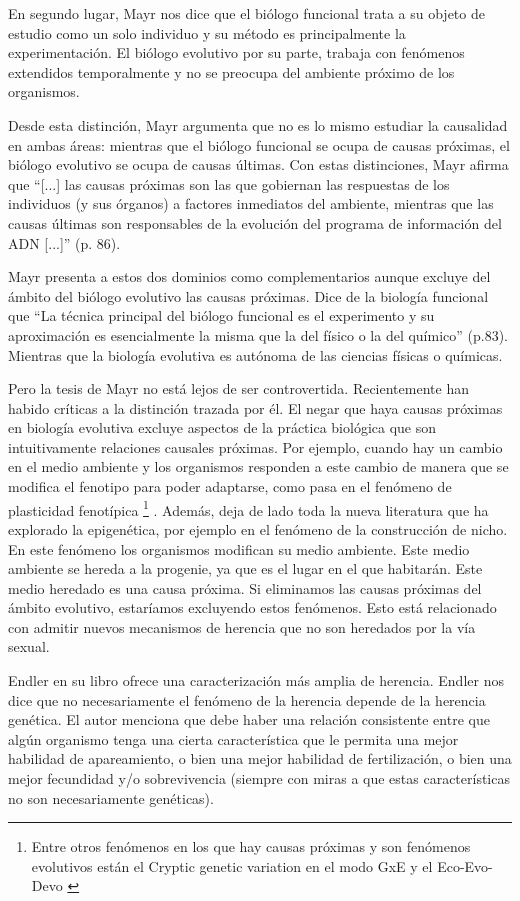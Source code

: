 En segundo lugar, Mayr nos dice que el biólogo funcional trata a su objeto de estudio como un solo individuo y su método es principalmente la experimentación. El biólogo evolutivo por su parte, trabaja con fenómenos extendidos temporalmente y no se preocupa del ambiente próximo de los organismos.

Desde esta distinción, Mayr argumenta que no es lo mismo estudiar la causalidad en ambas áreas: mientras que el biólogo funcional se ocupa de causas próximas, el biólogo evolutivo se ocupa de causas últimas. Con estas distinciones, Mayr afirma que ``[...] las causas próximas son las que gobiernan las respuestas de los individuos (y sus órganos) a factores inmediatos del ambiente, mientras que las causas últimas son responsables de la evolución del programa de información del ADN [...]'' (p. 86).

Mayr presenta a estos dos dominios como complementarios aunque excluye del ámbito del biólogo evolutivo las causas próximas. Dice de la biología funcional que ``La técnica principal del biólogo funcional es el experimento y su aproximación es esencialmente la misma que la del físico o la del químico'' (p.83). Mientras que la biología evolutiva es autónoma de las ciencias físicas o químicas.

Pero la tesis de Mayr no está lejos de ser controvertida. Recientemente han habido críticas a la distinción trazada por él. El negar que haya causas próximas en biología evolutiva excluye aspectos de la práctica biológica que son intuitivamente relaciones causales próximas. Por ejemplo, cuando hay un cambio en el medio ambiente y los organismos responden a este cambio de manera que se modifica el fenotipo para poder adaptarse, como pasa en el fenómeno de  plasticidad fenotípica \cite{WESTEBERHARD20082701}\footnote{Entre otros fenómenos en los que hay causas próximas y son fenómenos evolutivos están el Cryptic genetic variation en el modo GxE \cite{CVG} y el Eco-Evo-Devo \cite{PfenningEco-Evo-Devo}} . Además, deja de lado toda la nueva literatura que ha explorado la epigenética, por ejemplo en el fenómeno de la construcción de nicho. En este fenómeno los organismos modifican su medio ambiente. Este medio ambiente se hereda a la progenie, ya que es el lugar en el que habitarán. Este medio heredado es una causa próxima. Si eliminamos las causas próximas del ámbito evolutivo, estaríamos excluyendo estos fenómenos. Esto está relacionado con admitir nuevos mecanismos de herencia que no son heredados por la vía sexual.

Endler en su libro \citeyear{Endler1986} ofrece una caracterización más amplia de herencia. Endler nos dice que no necesariamente el fenómeno de la herencia depende de la herencia genética. El autor menciona que debe haber una relación consistente entre que algún organismo tenga una cierta característica que le permita una mejor habilidad de apareamiento, o bien una mejor habilidad de fertilización, o bien una mejor fecundidad y/o sobrevivencia (siempre con miras a que estas características no son necesariamente genéticas).

